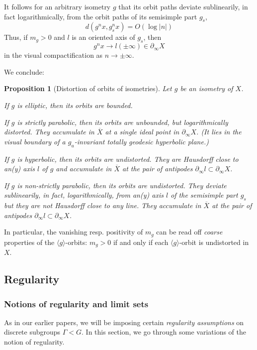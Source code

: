 \documentclass[12pt]{article}
\theoremstyle{boldplain}
\newtheorem{prop}[equation]{Proposition}
\theoremstyle{bolddefinition}
\numberwithin{equation}{section}
\def\Ga{\Gamma}
\def\geo{\partial_{\infty}}
\def\ol{\overline}
\def\<{\langle}
\def\>{\rangle}
\begin{document}
It follows for an arbitrary isometry $g$ 
that its orbit paths deviate sublinearily, in fact logarithmically, 
from the orbit paths of its semisimple part $g_s$,
\begin{equation}
\label{eq:sblndistorb}
d(g^nx,g_s^nx) = O(\log |n|) 
\end{equation}
Thus, if $m_g>0$ and $l$ is an oriented axis of $g_s$,
then 
\begin{equation*}
g^nx \to l(\pm\infty)\in\geo X
\end{equation*}
in the visual compactification as $n\to\pm\infty$.


We conclude:

\begin{prop}[Distortion of orbits of isometries]
\label{prop:dstorbism}
Let $g$ be an isometry of $X$.

If $g$ is {\em elliptic}, then its orbits are bounded.

If $g$ is {\em strictly parabolic}, then its orbits are unbounded, but logarithmically distorted.
They accumulate in $\ol X$ at a single ideal point in $\geo X$.
(It lies in the visual boundary of a $g_u$-invariant totally geodesic hyperbolic plane.)

If $g$ is 
{\em hyperbolic}, 
then its orbits are undistorted.
They are Hausdorff close to an(y) axis $l$ of $g$ and accumulate 
in $\ol X$ 
at the pair of antipodes $\geo l\subset\geo X$.

If $g$ is {\em non-strictly parabolic}, then its orbits are undistorted.
They deviate sublinearily, in fact, logarithmically, from an(y) axis $l$ of the semisimple part $g_s$ 
but they are not Hausdorff close to any line.
They accumulate in $\ol X$ 
at the pair of antipodes $\geo l\subset\geo X$.
\end{prop}


{In particular, the vanishing resp. positivity of $m_g$ can be read off {\em coarse} properties of the $\<g\>$-orbits: $m_g>0$ if and only if each $\<g\>$-orbit is undistorted in $X$.}


\subsection{Regularity}\label{sec:regularity}

\subsubsection{Notions of regularity and limit sets}
As in our earlier papers,
we will be imposing certain {\em regularity assumptions} on discrete subgroups $\Ga< G$. 
In this section, we go through some variations of the notion of regularity.
\end{document}
